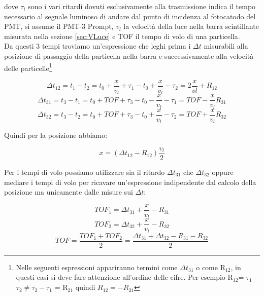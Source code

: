 \documentclass[a4paper]{article}
\begin{document}
dove $\tau_i$ sono i vari ritardi dovuti esclusivamente alla trasmissione indica il tempo necessario al segnale luminoso di andare dal punto di incidenza al fotocatodo del PMT, si assume il PMT-3 Prompt, $v_l$ la velocità della luce nella barra scintillante misurata nella sezione \ref{sec:VLuce} e TOF il tempo di volo di una particella.\\
Da questi 3 tempi troviamo un'espressione che leghi prima i $\Delta t$ misurabili alla posizione di passaggio della particella nella barra e successivamente alla velocità delle particelle\footnote{Nelle seguenti espressioni appariranno termini come $\Delta t_{31}$ o come R$_{12}$, in questi casi si deve fare attenzione all'ordine delle cifre. Per esempio R$_{12}$= $\tau_1$ - $\tau_2 \neq \tau_2 - \tau_1$ = R$_{21}$ quindi $R_{12}=-R_{21}$}

\begin{equation}
\Delta t_{12} = t_1 - t_2 = t_0 + \frac{x}{v_l} + \tau_1 - t_0 + \frac{x}{v_l} - \tau_2 = 2\frac{x}{vl} + R_{12}
\end{equation}
\begin{equation}
\Delta t_{31} = t_3 - t_1 = t_0 + TOF + \tau_3 - t_0 - \frac{x}{v_l} - \tau_1 = TOF - \frac{x}{v_l} R_{31}
\end{equation}
\begin{equation}
\Delta t_{32} = t_3 - t_2 = t_0 + TOF + \tau_3 - t_0 + \frac{x}{v_l} - \tau_2 = TOF + \frac{x}{v_l} R_{32}
\end{equation}

Quindi per la posizione abbiamo:

\begin{equation}
x = (\Delta t_{12} - R_{12})\frac{v_l}{2}
\label{eq:PosX}
\end{equation}

Per i tempi di volo possiamo utilizzare sia il ritardo $\Delta t_{31}$ che $\Delta t_{32}$ oppure mediare i tempi di volo per ricavare un'espressione indipendente dal calcolo della posizione ma unicamente dalle misure sui $\Delta t$:

\begin{equation}
TOF_1 = \Delta t_{31} + \frac{x}{v_l} - R_{31}
\label{eq:TOF1}
\end{equation}
\begin{equation}
TOF_2 = \Delta t_{32} + \frac{x}{v_l} - R_{32}
\label{eq:TOF2}
\end{equation}
\begin{equation}
TOF = \frac{TOF_1 + TOF_2}{2} = \frac{\Delta t_{31} + \Delta t_{32} - R_{31} - R_{32}}{2}
\label{eq:TOF}
\end{equation}
\end{document}
